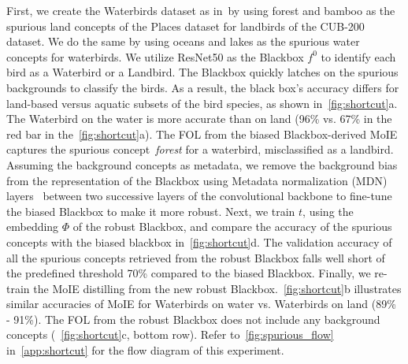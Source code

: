 First, we create the Waterbirds dataset as in~\cite{sagawa2019dro}by using forest and bamboo as the spurious land concepts of the Places dataset for landbirds of the CUB-200 dataset. We do the same by using oceans and lakes as the spurious water concepts for waterbirds. We utilize ResNet50 as the Blackbox $f^0$ to identify each bird as a Waterbird or a Landbird. The Blackbox quickly latches on the spurious backgrounds to classify the birds. As a result, the black box's accuracy differs for land-based versus aquatic subsets of the bird species, as shown in~\cref{fig:shortcut}a. The Waterbird on the water is more accurate than on land (96\%  vs. 67\% in the red bar in the~\cref{fig:shortcut}a). The FOL from the biased Blackbox-derived MoIE captures the spurious concept \textit{forest} for a waterbird, misclassified as a landbird. Assuming the background concepts as metadata, we remove the background bias from the representation of the Blackbox using Metadata normalization (MDN) layers~\cite{lu2021metadata} between two successive layers of the convolutional backbone to fine-tune the biased Blackbox to make it more robust. Next, we train $t$, using the embedding $\Phi$ of the robust Blackbox, and compare the accuracy of the spurious concepts with the biased blackbox in~\cref{fig:shortcut}d. The validation accuracy of all the spurious concepts retrieved from the robust Blackbox falls well short of the predefined threshold 70\% compared to the biased Blackbox. Finally, we re-train the MoIE distilling from the new robust Blackbox.~\cref{fig:shortcut}b illustrates similar accuracies of MoIE for Waterbirds on water vs. Waterbirds on land (89\% - 91\%). The FOL from the robust Blackbox does not include any background concepts (~\ref{fig:shortcut}c, bottom row). Refer to~\ref{fig:spurious_flow} in~\cref{app:shortcut} for the flow diagram of this experiment.